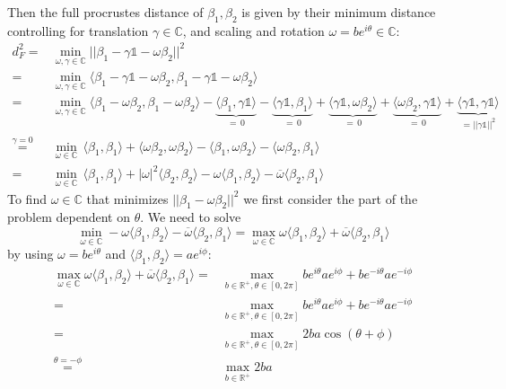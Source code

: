 Then the full procrustes distance of $\beta_1, \beta_2$ is given by their minimum distance controlling for translation $\gamma \in \mathbb{C}$, and scaling and rotation $\omega = b e^{i\theta} \in \mathbb{C}$:
\begin{align*}
    d_F^2 =& \min_{\omega,\gamma \in \mathbb{C}} ||\beta_1 - \gamma \mathbb{1} - \omega \beta_2 ||^2 \\
    =& \min_{\omega,\gamma \in \mathbb{C}} \langle\beta_1 - \gamma \mathbb{1} - \omega \beta_2, \beta_1 - \gamma \mathbb{1} - \omega \beta_2 \rangle \\
    =& \min_{\omega,\gamma \in \mathbb{C}}
    \langle \beta_1 - \omega \beta_2, \beta_1 - \omega \beta_2 \rangle
    - \underbrace{\langle \beta_1, \gamma \mathbb{1} \rangle}_{=\,0}
    - \underbrace{\langle \gamma \mathbb{1}, \beta_1 \rangle}_{=\,0}
    + \underbrace{\langle \gamma \mathbb{1}, \omega \beta_2 \rangle}_{=\,0}
    + \underbrace{\langle \omega \beta_2, \gamma \mathbb{1} \rangle}_{=\,0}
    + \underbrace{\langle \gamma \mathbb{1}, \gamma \mathbb{1} \rangle}_{=||\gamma \mathbb{1}||^2} \\
    \stackrel{\gamma=0}{=}& \min_{\omega \in \mathbb{C}}\,
    \langle \beta_1, \beta_1 \rangle
    + \langle \omega \beta_2, \omega \beta_2 \rangle
    - \langle \beta_1, \omega \beta_2 \rangle
    - \langle \omega \beta_2, \beta_1 \rangle \\
    =& \min_{\omega \in \mathbb{C}}\,
    \langle \beta_1, \beta_1 \rangle
    + |\omega|^2 \langle \beta_2, \beta_2 \rangle
    - \omega \langle \beta_1, \beta_2 \rangle
    - \overline{\omega} \langle \beta_2, \beta_1 \rangle
\end{align*}
To find $\omega \in \mathbb{C}$ that minimizes $||\beta_1 - \omega \beta_2||^2$ we first consider the part of the problem dependent on $\theta$. We need to solve
$$ \min_{\omega \in \mathbb{C}}
- \omega \langle \beta_1, \beta_2 \rangle
- \overline{\omega} \langle \beta_2, \beta_1 \rangle  =
\max_{\omega \in \mathbb{C}}
\omega \langle \beta_1, \beta_2 \rangle
+ \overline{\omega} \langle \beta_2, \beta_1 \rangle $$
by using $\omega = b e^{i\theta}$ and $\langle \beta_1, \beta_2 \rangle = a e^{i\phi}$:
\begin{align*}
    \max_{\omega \in \mathbb{C}}
    \omega \langle \beta_1, \beta_2 \rangle
    + \overline{\omega} \langle \beta_2, \beta_1 \rangle
    =& \max_{b \in \mathbb{R}^+, \theta \in [0,2\pi]}
    b e^{i\theta} a e^{i\phi} + b e^{-i\theta} a e^{-i\phi} \\
    =& \max_{b \in \mathbb{R}^+, \theta \in [0,2\pi]}
    b e^{i\theta} a e^{i\phi} + b e^{-i\theta} a e^{-i\phi} \\
    =& \max_{b \in \mathbb{R}^+, \theta \in [0,2\pi]}
    2 b a \cos\left(\theta +\phi\right)\\
    \stackrel{\theta = -\phi}{=}& \max_{b \in \mathbb{R}^+}
    2 b a
\end{align*}
